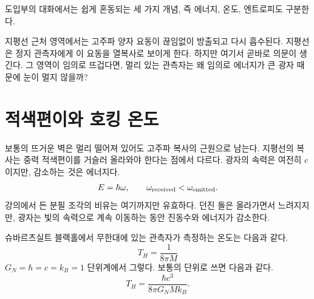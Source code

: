 도입부의 대화에서는 쉽게 혼동되는 세 가지 개념, 즉 에너지, 온도, 엔트로피도 구분한다.

\begin{classroomqa}
\end{classroomqa}


지평선 근처 영역에서는 고주파 양자 요동이 끊임없이 방출되고 다시 흡수된다. 지평선은 정지 관측자에게 이 요동을 열복사로 보이게 한다. 하지만 여기서 곧바로 의문이 생긴다. 그 영역이 임의로 뜨겁다면, 멀리 있는 관측자는 왜 임의로 에너지가 큰 광자 때문에 눈이 멀지 않을까?

\section{적색편이와 호킹 온도}

보통의 뜨거운 벽은 멀리 떨어져 있어도 고주파 복사의 근원으로 남는다. 지평선의 복사는 중력 적색편이를 거슬러 올라와야 한다는 점에서 다르다. 광자의 속력은 여전히 \(c\)이지만, 감소하는 것은 에너지다.
\begin{equation}
E=\hbar\omega,
\qquad
\omega_{\rm received}<\omega_{\rm emitted}.
\end{equation}
강의에서 든 분필 조각의 비유는 여기까지만 유효하다. 던진 돌은 올라가면서 느려지지만, 광자는 빛의 속력으로 계속 이동하는 동안 진동수와 에너지가 감소한다.

슈바르츠실트 블랙홀에서 무한대에 있는 관측자가 측정하는 온도는 다음과 같다.
\begin{equation}
T_H=\frac{1}{8\pi M}
\label{eq:l09-hawking-natural}
\end{equation}
\(G_N=\hbar=c=k_B=1\) 단위계에서 그렇다. 보통의 단위로 쓰면 다음과 같다.
\begin{equation}
T_H=\frac{\hbar c^3}{8\pi G_N M k_B}.
\label{eq:l09-hawking-full}
\end{equation}

